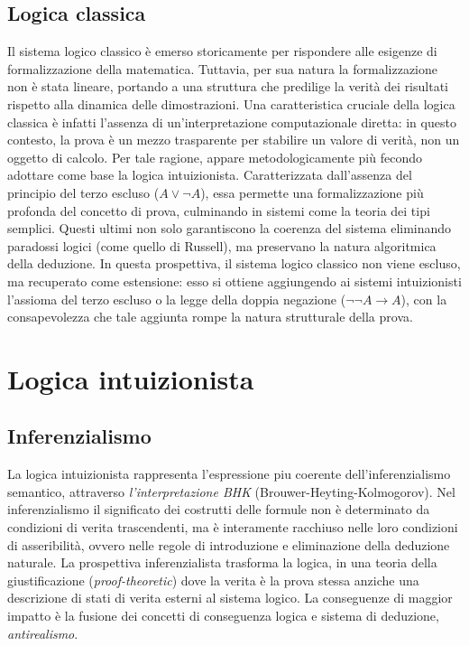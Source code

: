 \subsection{Logica classica}
Il sistema logico classico è emerso storicamente per rispondere alle esigenze di formalizzazione della matematica. Tuttavia, per sua natura la formalizzazione non è stata lineare, portando a una 
struttura che predilige la verità dei risultati rispetto alla dinamica delle dimostrazioni. Una caratteristica cruciale della logica classica è infatti l'assenza di un'interpretazione computazionale 
diretta: in questo contesto, la prova è un mezzo trasparente per stabilire un valore di verità, non un oggetto di calcolo. Per tale ragione, appare metodologicamente più fecondo adottare come base 
la logica intuizionista. Caratterizzata dall'assenza del principio del terzo escluso ($A \vee \neg A$), essa permette una formalizzazione più profonda del concetto di prova, culminando in sistemi 
come la teoria dei tipi semplici. Questi ultimi non solo garantiscono la coerenza del sistema eliminando paradossi logici (come quello di Russell), ma preservano la natura algoritmica della deduzione. 
In questa prospettiva, il sistema logico classico non viene escluso, ma recuperato come estensione: esso si ottiene aggiungendo ai sistemi intuizionisti l'assioma del terzo escluso o la legge della 
doppia negazione ($\neg \neg A \to A$), con la consapevolezza che tale aggiunta rompe la natura strutturale della prova.


\section{Logica intuizionista}

\subsection{Inferenzialismo}
La logica intuizionista rappresenta l'espressione piu coerente dell'inferenzialismo semantico, attraverso \emph{l'interpretazione BHK} (Brouwer-Heyting-Kolmogorov). Nel inferenzialismo
il significato dei costrutti delle formule non è determinato da condizioni di verita trascendenti, ma è interamente racchiuso nelle loro condizioni di asseribilità, ovvero
nelle regole di introduzione e eliminazione della deduzione naturale. La prospettiva inferenzialista trasforma la logica, in una teoria della giustificazione (\emph{proof-theoretic}) 
dove la verita è la prova stessa anziche una descrizione di stati di verita esterni al sistema logico. La conseguenze di maggior impatto è la fusione  dei concetti di conseguenza logica
e sistema di deduzione, \emph{antirealismo}. 

